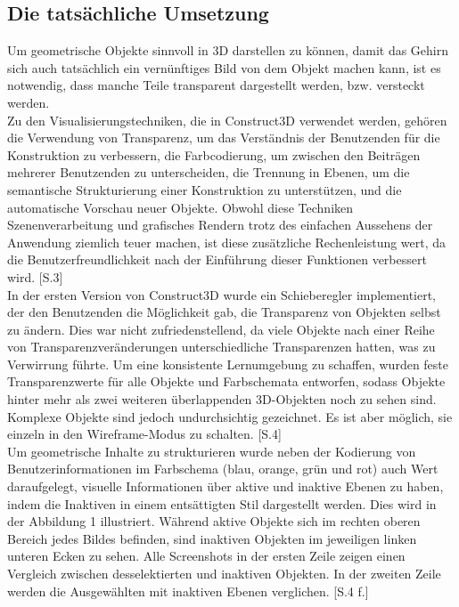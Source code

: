 \documentclass[deutsch]{llncs}
\begin{document}
\subsection{Die tatsächliche Umsetzung}
\label{subsec:}
Um geometrische Objekte sinnvoll in 3D darstellen zu können, damit das Gehirn sich auch tatsächlich ein vernünftiges Bild von dem Objekt machen kann,
ist es notwendig, dass manche Teile transparent dargestellt werden, bzw. versteckt werden. \\
Zu den Visualisierungstechniken, die in Construct3D verwendet werden, gehören die Verwendung von Transparenz, um das Verständnis der 
Benutzenden für die Konstruktion zu verbessern, die Farbcodierung, um zwischen den Beiträgen mehrerer Benutzenden zu unterscheiden, 
die Trennung in Ebenen, um die semantische Strukturierung einer Konstruktion zu unterstützen, und die automatische Vorschau neuer Objekte. 
Obwohl diese Techniken Szenenverarbeitung und grafisches Rendern trotz des einfachen Aussehens der Anwendung ziemlich teuer machen, 
ist diese zusätzliche Rechenleistung wert, da die Benutzerfreundlichkeit nach der Einführung dieser Funktionen verbessert wird. [S.3]\\
In der ersten Version von Construct3D wurde ein Schieberegler implementiert, der den Benutzenden die Möglichkeit gab, die Transparenz von 
Objekten selbst zu ändern. Dies war nicht zufriedenstellend, da viele Objekte nach einer Reihe von Transparenzveränderungen unterschiedliche 
Transparenzen hatten, was zu Verwirrung führte. Um eine konsistente Lernumgebung zu schaffen, wurden feste Transparenzwerte für alle Objekte und
 Farbschemata entworfen, sodass Objekte hinter mehr als zwei weiteren überlappenden 3D-Objekten noch zu sehen sind. Komplexe Objekte sind 
jedoch undurchsichtig gezeichnet. Es ist aber möglich, sie einzeln in den Wireframe-Modus zu schalten. [S.4]
\noindent \\
Um geometrische Inhalte zu strukturieren wurde neben der Kodierung von Benutzerinformationen im Farbschema (blau, orange, grün und rot) auch 
Wert daraufgelegt, visuelle Informationen über aktive und inaktive Ebenen zu haben, indem die Inaktiven in einem entsättigten Stil dargestellt werden. 
Dies wird in der Abbildung 1 illustriert. Während aktive Objekte sich im rechten oberen Bereich jedes Bildes befinden, sind inaktiven Objekten im jeweiligen
 linken unteren Ecken zu sehen. Alle Screenshots in der ersten Zeile zeigen einen Vergleich zwischen desselektierten und inaktiven Objekten.
 In der zweiten Zeile werden die Ausgewählten mit inaktiven Ebenen verglichen. [S.4 f.]
\end{document}
